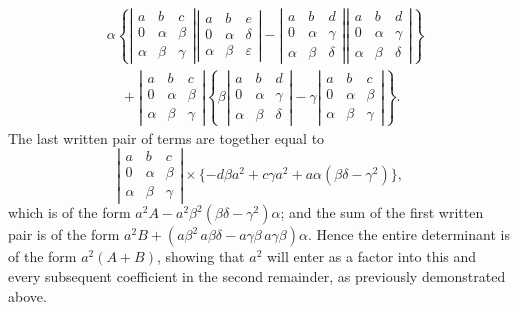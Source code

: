 \documentclass[11pt]{article}
\newcommand{\sourcepage}[1]{\marginpar{\scriptsize p.~#1}}
\newcommand{\sdet}[1]{\left|\begin{smallmatrix}#1\end{smallmatrix}\right|}
\begin{document}
\sourcepage{442}
\[
\begin{aligned}
&\alpha\left\{
\sdet{a&b&c\\0&\alpha&\beta\\ \alpha&\beta&\gamma}
\sdet{a&b&e\\0&\alpha&\delta\\ \alpha&\beta&\varepsilon}
-
\sdet{a&b&d\\0&\alpha&\gamma\\ \alpha&\beta&\delta}
\sdet{a&b&d\\0&\alpha&\gamma\\ \alpha&\beta&\delta}
\right\}\\
&\quad+
\sdet{a&b&c\\0&\alpha&\beta\\ \alpha&\beta&\gamma}
\left\{
\beta\sdet{a&b&d\\0&\alpha&\gamma\\ \alpha&\beta&\delta}
-\gamma\sdet{a&b&c\\0&\alpha&\beta\\ \alpha&\beta&\gamma}
\right\}.
\end{aligned}
\]
The last written pair of terms are together equal to
\[
\sdet{a&b&c\\0&\alpha&\beta\\ \alpha&\beta&\gamma}
\times\{-d\beta a^2+c\gamma a^2+a\alpha(\beta\delta-\gamma^2)\},
\]
which is of the form $a^2A-a^2\beta^2(\beta\delta-\gamma^2)\alpha$; and the sum of the first written pair is of the form $a^2B+(a\beta^2\,a\beta\delta-a\gamma\beta\,a\gamma\beta)\alpha$. Hence the entire determinant is of the form $a^2(A+B)$, showing that $a^2$ will enter as a factor into this and every subsequent coefficient in the second remainder, as previously demonstrated above.
\end{document}
